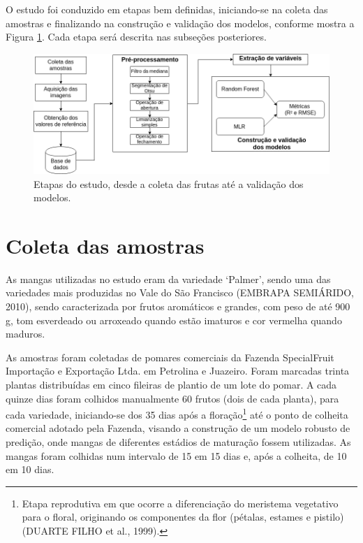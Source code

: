 O estudo foi conduzido em etapas bem definidas, iniciando-se na coleta das amostras e finalizando na construção e validação dos modelos, conforme mostra a Figura \ref{fig:diag}. Cada etapa será descrita nas subseções posteriores.

\begin{figure}[H]
\centering
    \caption{Etapas do estudo, desde a coleta das frutas até a validação dos modelos.}\label{fig:diag}
    \includegraphics[scale=0.5]{img/diag.png}
\end{figure}

\section{Coleta das amostras}

As mangas utilizadas no estudo eram da variedade ‘Palmer’, sendo uma das variedades mais produzidas no Vale do São Francisco (EMBRAPA SEMIÁRIDO, 2010), sendo caracterizada por frutos aromáticos e grandes, com peso de até 900 g, tom esverdeado ou arroxeado quando estão imaturos e cor vermelha quando maduros. 

As amostras foram coletadas de pomares comerciais da Fazenda SpecialFruit Importação e Exportação Ltda. em Petrolina e Juazeiro. Foram marcadas trinta plantas distribuídas em cinco fileiras de plantio de um lote do pomar. A cada quinze dias foram colhidos manualmente 60 frutos (dois de cada planta), para cada variedade, iniciando-se dos 35 dias após a floração\footnote{\label{ftnote:floracao} Etapa reprodutiva em que ocorre a diferenciação do meristema vegetativo para o floral, originando os componentes da flor (pétalas, estames e pistilo) (DUARTE FILHO et al., 1999).} até o ponto de colheita comercial adotado pela Fazenda, visando a construção de um modelo robusto de predição, onde mangas de diferentes estádios de maturação fossem utilizadas. As mangas foram colhidas num intervalo de 15 em 15 dias e, após a colheita, de 10 em 10 dias.

